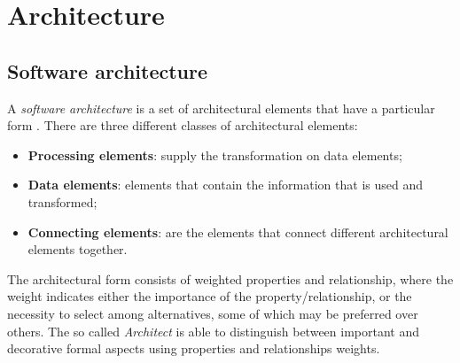 \documentclass[\main/main.tex]{subfiles}
\begin{document}
\chapter{Architecture}

\section{Software architecture}
A \emph{software architecture} is a set of architectural elements that have a particular form \cite{Perry1992FoundationsFT}. There are three different classes of architectural elements: 
\begin{itemize}
    \item \textbf{Processing elements}: supply the transformation on data elements;
    \item \textbf{Data elements}: elements that contain the information that is used and transformed;
    \item \textbf{Connecting elements}: are the elements that connect different architectural elements together.
\end{itemize}
The architectural form consists of weighted properties and relationship, where the weight indicates either the importance of the property/relationship, or the necessity to select among alternatives, some of which may be preferred over others. The so called \emph{Architect} is able to distinguish between important and decorative formal aspects using properties and relationships weights.
\end{document}
